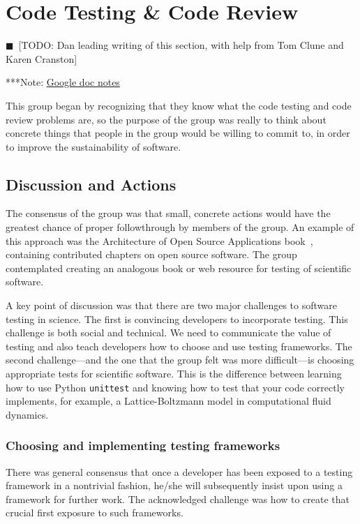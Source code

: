 \documentclass[11pt, oneside]{amsart}
\newcommand{\todo}[1]{{\color{blue}$\blacksquare$~\textsf{[TODO: #1]}}}
\newcommand{\note}[1]{ {\textcolor{blueish}    { ***Note:      #1 }}}
\begin{document}
\section{Code Testing \& Code Review} \label{sec:code_testing}
\todo{Dan leading writing of this section, with help from Tom Clune and Karen Cranston}

\note{\href{http://tinyurl.com/l5t5h45}{Google doc notes}}

This group began by recognizing that they know what the code testing and code review problems are, so the purpose of the group was really to think about concrete things that people in the group would be willing to commit to, in order to improve the sustainability of software.

\subsection{Discussion and Actions}

The consensus of the group was that small, concrete actions would have
the greatest chance of proper followthrough by members of the group.
An example of this approach was the Architecture of Open Source
Applications book~\cite{aosa}, containing contributed chapters on open
source software.
The group contemplated creating an analogous book or web resource for
testing of scientific software.

A key point of discussion was that there are two major challenges to software
testing in science. The first is convincing developers to incorporate testing. This 
challenge is both social and technical. We need to communicate the value of testing
and also teach developers how to choose and use testing frameworks. The second 
challenge---and the one that the group felt was more difficult---is choosing  
appropriate tests for scientific software. This is the difference between learning how to use Python 
\texttt{unittest} and knowing how to test that your code correctly implements, for example, a 
Lattice-Boltzmann model in computational fluid dynamics. 

\subsubsection{Choosing and implementing testing frameworks}
There was general consensus that once a developer has been
exposed to a testing framework in a nontrivial fashion, he/she will
subsequently insist upon using a framework for further work.
The acknowledged challenge was how to create that crucial first exposure
to such frameworks.
\end{document}
